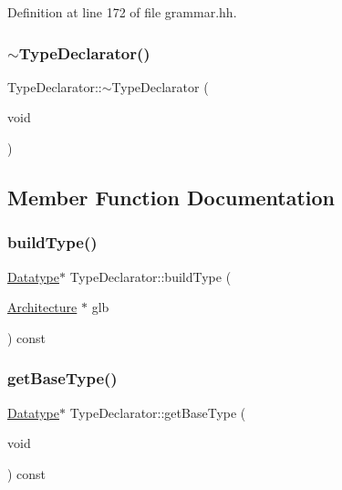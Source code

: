 Definition at line 172 of file grammar.\+hh.

\mbox{\label{class_type_declarator_a4cd7bc991831e053f971b342d8d63646}} 
\subsubsection{\texorpdfstring{$\sim$TypeDeclarator()}{~TypeDeclarator()}}
{\footnotesize\ttfamily Type\+Declarator\+::$\sim$\+Type\+Declarator (\begin{DoxyParamCaption}\item[{void}]{ }\end{DoxyParamCaption})}



\subsection{Member Function Documentation}
\mbox{\label{class_type_declarator_a1bdf96b09fb4a4095ec30ee49ee725b9}} 
\subsubsection{\texorpdfstring{buildType()}{buildType()}}
{\footnotesize\ttfamily \mbox{\hyperlink{class_datatype}{Datatype}}$\ast$ Type\+Declarator\+::build\+Type (\begin{DoxyParamCaption}\item[{\mbox{\hyperlink{class_architecture}{Architecture}} $\ast$}]{glb }\end{DoxyParamCaption}) const}

\mbox{\label{class_type_declarator_a00220cba3d39b4eb2caf84d4817d9213}} 
\subsubsection{\texorpdfstring{getBaseType()}{getBaseType()}}
{\footnotesize\ttfamily \mbox{\hyperlink{class_datatype}{Datatype}}$\ast$ Type\+Declarator\+::get\+Base\+Type (\begin{DoxyParamCaption}\item[{void}]{ }\end{DoxyParamCaption}) const\hspace{0.3cm}{\ttfamily [inline]}}



